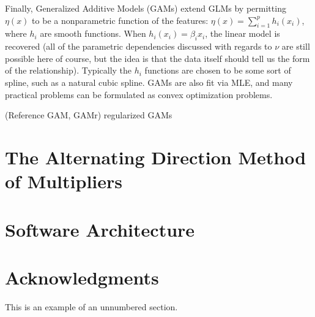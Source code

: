 \documentclass[12pt]{article}
\begin{document}
Finally, Generalized Additive Models (GAMs) extend GLMs by permitting $\eta(x)$ to be a nonparametric function of the features: $\eta(x) = \sum_{i=1}^p h_i (x_i)$, where $h_i$ are smooth functions. When $h_i(x_i) = \beta_i x_i$, the linear model is recovered (all of the parametric dependencies discussed with regards to $\nu$  are still possible here of course, but the idea is that the data itself should tell us the form of the relationship). Typically the $h_i$ functions are chosen to be some sort of spline, such as a natural cubic spline. GAMs are also fit via MLE, and many practical problems can be formulated as convex optimization problems.

(Reference GAM, GAMr) regularized GAMs 

\section{The Alternating Direction Method of Multipliers}
\label{sec:admm}

\section{Software Architecture}
\label{sec:arch}

\section*{Acknowledgments}

This is an example of an unnumbered section.

\newpage

\end{document}
